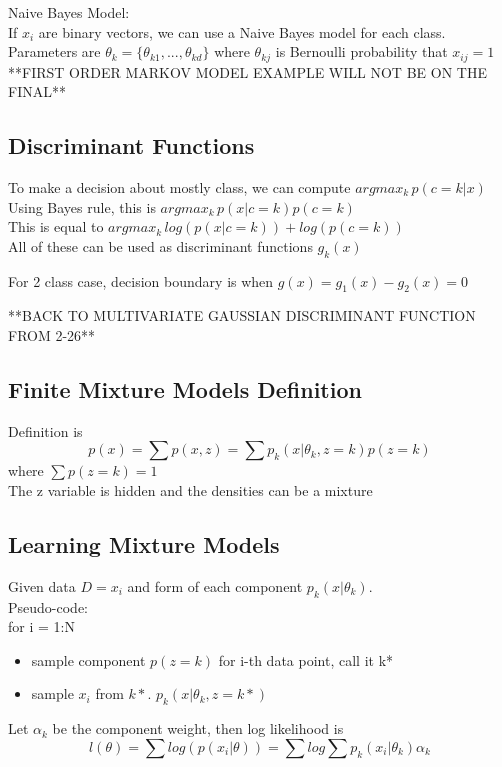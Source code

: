 \documentclass[11pt,psfig]{article}
\begin{document}
Naive Bayes Model:
\\
If $x_i$ are binary vectors, we can use a Naive Bayes model for each class. Parameters are $\theta_k = \{\theta_{k1},...,\theta_{kd}\}$ where $\theta_{kj}$ is Bernoulli probability that $x_{ij}=1$
\\
**FIRST ORDER MARKOV MODEL EXAMPLE WILL NOT BE ON THE FINAL**

\subsection*{Discriminant Functions}

To make a decision about mostly class, we can compute $argmax_k \,p(c=k|x)$\\
Using Bayes rule, this is $argmax_k \, p(x|c=k)p(c=k)$\\
This is equal to $argmax_k \, log(p(x|c=k)) + log(p(c=k))$
\\
All of these can be used as discriminant functions $g_k(x)$

For 2 class case, decision boundary is when $g(x) = g_1(x)-g_2(x) = 0$

**BACK TO MULTIVARIATE GAUSSIAN DISCRIMINANT FUNCTION FROM 2-26**

\subsection*{Finite Mixture Models Definition}
Definition is
\[
p(x) = \sum{p(x,z)} = \sum p_k(x|\theta_k,z=k)p(z=k)
\]
where $\sum{p(z=k)}=1$
\\
The z variable is hidden and the densities can be a mixture

\subsection*{Learning Mixture Models}

Given data $D={x_i}$ and form of each component $p_k(x|\theta_k)$. 
\\
Pseudo-code:
\\
for i = 1:N
\begin{itemize}
\item sample component $p(z=k)$ for i-th data point, call it k*
\item sample $x_i$ from $k*$. $p_k(x|\theta_k,z=k*)$
\end{itemize}

Let $\alpha_k$ be the component weight, then log likelihood is
\[
l(\theta) = \sum{log(p(x_i|\theta))} = \sum{log\sum{p_k(x_i|\theta_k)\alpha_k}}
\]
\end{document}
